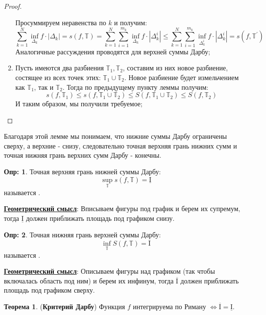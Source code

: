 \documentclass[12pt]{article}
\newcommand{\MTB}{\mathbb{T}}
\newcommand{\MI}{\mathrm{I}}
\theoremstyle{definition}
\newtheorem{defn}{Опр:}
\newtheorem{theorem}{Теорема}
\begin{document}
\begin{proof}
\begin{enumerate}[label={(\arabic*)}]
$$		$$
		Просуммируем неравенства по $k$ и получим:
		$$
			\sum\limits_{k = 1}^{N}\inf\limits_{\Delta_k}f{\cdot}|\Delta_k| = s(f,\MTB) =  \sum\limits_{k = 1}^{N}\sum\limits_{i = 1}^{m_k}\inf\limits_{\Delta_k}f{\cdot}|\Delta_k^i| \leq \sum\limits_{k = 1}^{N}\sum\limits_{i = 1}^{m_k}\inf\limits_{\Delta_k^i}f{\cdot}|\Delta_k^i| = s(f,\MTB^\prime)
		$$
		Аналогичные рассуждения проводятся для верхней суммы Дарбу;
		\item Пусть имеются два разбиения $\MTB_1, \MTB_2$, составим из них новое разбиение, состящее из всех точек этих: $\MTB_1 \cup \MTB_2$. Новое разбиение будет измельчением как $\MTB_1$, так и $\MTB_2$. Тогда по предыдущему пункту леммы получим:
		$$
			s(f,\MTB_1) \leq s(f,\MTB_1 \cup \MTB_2) \leq S(f,\MTB_1 \cup \MTB_2) \leq S(f,\MTB_2)
		$$
		И таким образом, мы получили требуемое;
	\end{enumerate}
\end{proof}
Благодаря этой лемме мы понимаем, что нижние суммы Дарбу ограничены сверху, а верхние - снизу, следовательно точная верхняя грань нижних сумм и точная нижняя грань верхних сумм Дарбу - конечны.
\begin{defn}
	Точная верхняя грань нижней суммы Дарбу:
	$$
		\sup\limits_{\MTB}s(f,\MTB) = \underline{\MI}
	$$
	называется .
\end{defn}

\textbf{\uline{Геометрический смысл}}: Вписываем фигуры под график и берем их супремум, тогда $\underline{\MI}$ должен приближать площадь под графиком снизу.

\begin{defn}
	Точная нижняя грань верхней суммы Дарбу:
	$$
	\inf\limits_{\MTB}S(f,\MTB) = \overline{\MI}
	$$
	называется .
\end{defn}

\textbf{\uline{Геометрический смысл}}: Описываем фигуры над графиком (так чтобы включалась область под ним) и берем их инфинум, тогда $\overline{\MI}$ должен приближать площадь под графиком сверху.

\begin{theorem}(\textbf{Критерий Дарбу})
	Функция $f$ интегрируема по Риману $\Leftrightarrow  \overline{\MI} = \underline{\MI}$.
\end{theorem}
\end{document}
